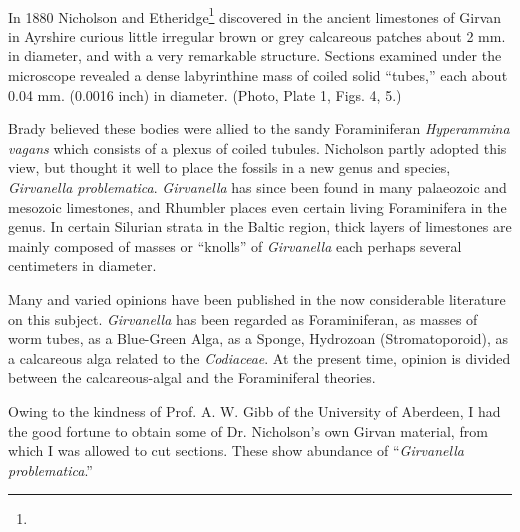 \documentclass[a4paper, 12pt, oneside]{article}
\begin{document}
\paragraph{}
In 1880 Nicholson and Etheridge\footnote{} discovered in the ancient limestones of Girvan in Ayrshire curious little irregular brown or grey calcareous patches about 2 mm. in diameter, and with a very remarkable structure. Sections examined under the microscope revealed a dense labyrinthine mass of coiled solid ``tubes,'' each about 0.04 mm. (0.0016 inch) in diameter. (Photo, Plate 1, Figs. 4, 5.)

Brady believed these bodies were allied to the sandy Foraminiferan \emph{Hyperammina vagans} which consists of a plexus of coiled tubules. Nicholson partly adopted this view, but thought it well to place the fossils in a new genus and species, \emph{Girvanella problematica}. \emph{Girvanella} has since been found in many palaeozoic and mesozoic limestones, and Rhumbler places even certain living Foraminifera in the genus. In certain Silurian strata in the Baltic region, thick layers of limestones are mainly composed of masses or ``knolls'' of \emph{Girvanella} each perhaps several centimeters in diameter.

Many and varied opinions have been published in the now considerable literature on this subject. \emph{Girvanella} has been regarded as Foraminiferan, as masses of worm tubes, as a Blue-Green Alga, as a Sponge, Hydrozoan (Stromatoporoid), as a calcareous alga related to the \emph{Codiaceae}. At the present time, opinion is divided between the calcareous-algal and the Foraminiferal theories.

Owing to the kindness of Prof. A. W. Gibb of the University of Aberdeen, I had the good fortune to obtain some of Dr. Nicholson's own Girvan material, from which I was allowed to cut sections. These show abundance of ``\emph{Girvanella problematica}.''
\end{document}

